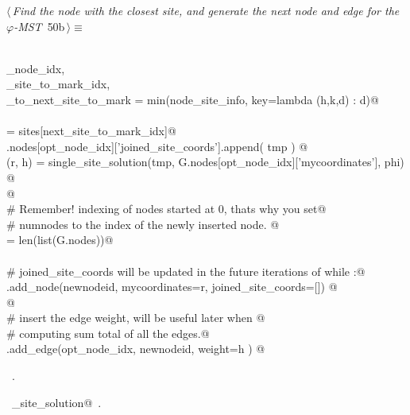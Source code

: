 \documentclass[11.5pt]{report}
\begin{document}
\needspace{3cm}
\vspace{-0.8cm} \newchunk
\begin{flushleft} \small
\begin{minipage}{\linewidth}\label{scrap78}\raggedright\small
{} $\langle\,${\itshape Find the node with the closest site, and generate the next node and edge for the $\varphi$-MST}\nobreak\ {\footnotesize {50b}}$\,\rangle\equiv$
\vspace{-1ex}
\begin{list}{}{} \item
\mbox{}\verb@@\\
\mbox{}\verb@opt_node_idx,          \@\\
\mbox{}\verb@next_site_to_mark_idx, \@\\
\mbox{}\verb@distance_to_next_site_to_mark = min(node_site_info, key=lambda (h,k,d) : d)@\\
\mbox{}\verb@@\\
\mbox{}\verb@tmp = sites[next_site_to_mark_idx]@\\
\mbox{}\verb@G.nodes[opt_node_idx]['joined_site_coords'].append(  tmp   ) @\\
\mbox{}\verb@(r, h) = single_site_solution(tmp, G.nodes[opt_node_idx]['mycoordinates'], phi) @\\
\mbox{}\verb@          @\\
\mbox{}\verb@# Remember! indexing of nodes started at 0, thats why you set@\\
\mbox{}\verb@# numnodes to the index of the newly inserted node. @\\
\mbox{}\verb@newnodeid = len(list(G.nodes))@\\
\mbox{}\verb@@\\
\mbox{}\verb@# joined_site_coords will be updated in the future iterations of while :@\\
\mbox{}\verb@G.add_node(newnodeid, mycoordinates=r, joined_site_coords=[]) @\\
\mbox{}\verb@  @\\
\mbox{}\verb@# insert the edge weight, will be useful later when @\\
\mbox{}\verb@# computing sum total of all the edges.@\\
\mbox{}\verb@G.add_edge(opt_node_idx, newnodeid, weight=h ) @\\
\mbox{}\verb@@{\NWsep}
\end{list}
\vspace{-1.5ex}
\footnotesize
\begin{list}{}{\setlength{\itemsep}{-\parsep}\setlength{\itemindent}{-\leftmargin}}
\item \NWtxtMacroRefIn\ .
\item \NWtxtIdentsUsed\nobreak\  \verb@single_site_solution@\nobreak\ .
\item{}
\end{list}
\end{minipage}\vspace{4ex}
\end{flushleft}
\end{document}
